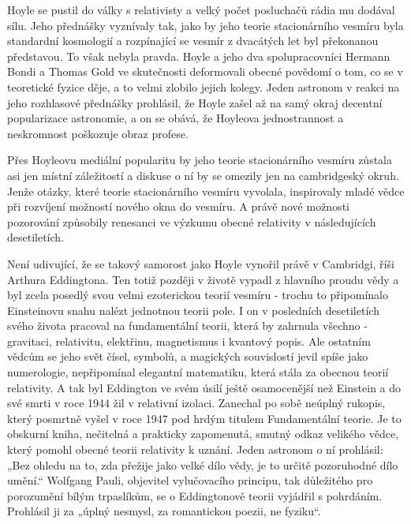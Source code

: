   Hoyle se pustil do války s relativisty a velký počet posluchačů rádia mu dodával sílu. Jeho
  přednášky vyznívaly tak, jako by jeho teorie stacionárního vesmíru byla standardní kosmologií a
  rozpínající se vesmír z dvacátých let byl překonanou představou. To však nebyla pravda. Hoyle a
  jeho dva spolupracovníci Hermann Bondi a Thomas Gold ve skutečnosti deformovali obecné povědomí o
  tom, co se v teoretické fyzice děje, a to velmi zlobilo jejich kolegy. Jeden astronom v reakci na
  jeho rozhlasové přednášky prohlásil, že Hoyle zašel až na samý okraj decentní popularizace
  astronomie, a on se obává, že Hoyleova jednostrannost a neskromnost poškozuje obraz profese.

  Přes Hoyleovu mediální popularitu by jeho teorie stacionárního vesmíru zůstala asi jen místní
  záležitostí a diskuse o ní by se omezily jen na cambridgeský okruh. Jenže otázky, které teorie
  stacionárního vesmíru vyvolala, inspirovaly mladé vědce při rozvíjení možností nového okna do
  vesmíru. A právě nové možnosti pozorování způsobily renesanci ve výzkumu obecné relativity v
  následujících desetiletích. 

  Není udivující, že se takový samorost jako Hoyle vynořil právě v Cambridgi, říši Arthura
  Eddingtona. Ten totiž později v životě vypadl z hlavního proudu vědy a byl zcela posedlý svou
  velmi ezoterickou teorií vesmíru - trochu to připomínalo Einsteinovu snahu nalézt jednotnou teorii
  pole. I on v posledních desetiletích svého života pracoval na fundamentální teorii, která by
  zahrnula všechno - gravitaci, relativitu, elektřinu, magnetismus i kvantový popis. Ale ostatním
  vědcům se jeho svět čísel, symbolů, a magických souvislostí jevil spíše jako numerologie,
  nepřipomínal elegantní matematiku, která stála za obecnou teorií relativity. A tak byl Eddington
  ve svém úsilí ještě osamocenější než Einstein a do své smrti v roce 1944 žil v relativní izolaci.
  Zanechal po sobě neúplný rukopis, který posmrtně vyšel v roce 1947 pod hrdým titulem Fundamentální
  teorie. Je to obskurní kniha, nečitelná a prakticky zapomenutá, smutný odkaz velikého vědce, který
  pomohl obecné teorii relativity k uznání. Jeden astronom o ní prohlásil: „Bez ohledu na to, zda
  přežije jako velké dílo vědy, je to určitě pozoruhodné dílo umění.“ Wolfgang Pauli, objevitel
  vylučovacího principu, tak důležitého pro porozumění bílým trpaslíkům, se o Eddingtonově teorii
  vyjádřil s pohrdáním. Prohlásil ji za „úplný nesmysl, za romantickou poezii, ne fyziku“. 

